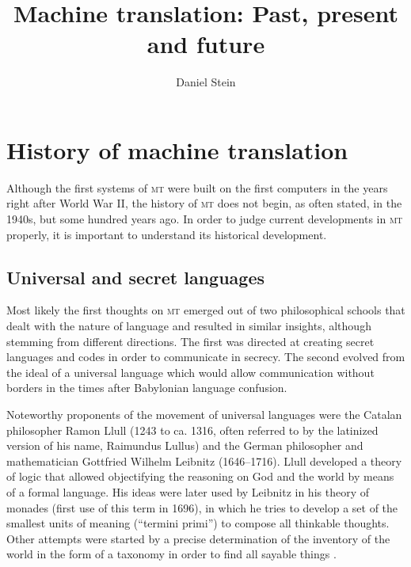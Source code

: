 \documentclass[output=paper]{LSP/langsci}
\author{Daniel Stein\affiliation{Universität Hamburg, Hamburger Zentrum für Sprachkorpora} }
\title{Machine translation: Past, present and future}
\begin{document}

\section{History of machine translation}\label{sec:stein:1}

Although the first systems of \textsc{mt} were built on the first computers in the years right after World War II, the history of \textsc{mt} does not begin, as often stated, in the 1940s, but some hundred years ago. In order to judge current developments in \textsc{mt} properly, it is important to understand its historical development. 

\subsection{Universal and secret languages}\label{sec:stein:1.1}
 
Most likely the first thoughts on \textsc{mt} emerged out of two philosophical schools that dealt with the nature of language and resulted in similar insights, although stemming from different directions. The first was directed at creating secret languages and codes in order to communicate in secrecy. The second evolved from the ideal of a universal language which would allow communication without borders in the times after Babylonian language confusion.
 
Noteworthy proponents of the movement of universal languages were the Catalan philosopher Ramon Llull (1243 to ca. 1316, often referred to by the latinized version of his name, Raimundus Lullus) and the German philosopher and mathematician Gottfried Wilhelm Leibnitz (1646--1716). Llull developed a theory of logic that allowed objectifying the reasoning on God and the world by means of a formal language. His ideas were later used by Leibnitz in his theory of monades (first use of this term in 1696), in which he tries to develop a set of the smallest units of meaning (``termini primi'') to compose all thinkable thoughts. Other attempts were started by a precise determination of the inventory of the world in the form of a taxonomy in order to find all sayable things \citep{Gardt1999}.
 
\end{document}
